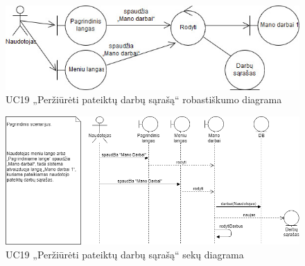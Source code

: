 \documentclass{VUMIFPSbakalaurinis}
\begin{document}
\begin{figure}[H]
	\centering
	\includegraphics[scale=0.6]{img/Robustness/UC19}
	\caption{UC19 „Peržiūrėti pateiktų darbų sąrašą“ robastiškumo diagrama}
	\label{img:uc19rob}
\end{figure}

\begin{figure}[H]
	\centering
	\includegraphics[scale=0.6]{img/Sequence/SD19}
	\caption{UC19 „Peržiūrėti pateiktų darbų sąrašą“ sekų diagrama}
	\label{img:uc19seq}
\end{figure}
\end{document}
